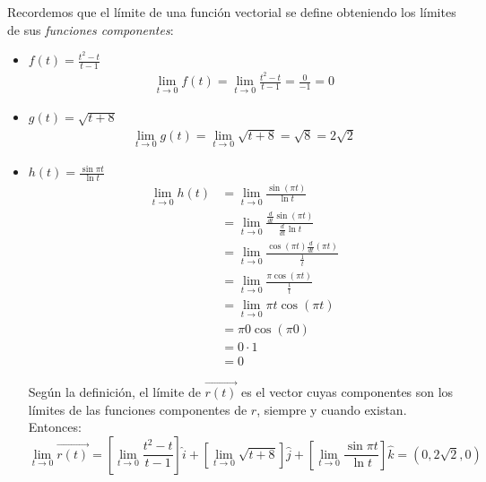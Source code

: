 \documentclass[12pt]{article}
\begin{document}
Recordemos que el límite de una función vectorial se define obteniendo los límites de sus \textit{funciones componentes}:
\begin{itemize}[format=\textbf]

\item $f(t)=\frac{t^2-t}{t-1}$
  \begin{align*}
    \lim_{t \to 0} f(t) = \lim_{t \to 0} \frac{t^2-t}{t-1}  =  \frac{0}{-1}= 0
  \end{align*}

\item $g(t)=\sqrt{t+8}$
  \begin{align*}
    \lim_{t \to 0} g(t) = \lim_{t \to 0} \sqrt{t+8} = \sqrt{8} = 2\sqrt{2}
  \end{align*}

\item $h(t)=\frac{\sin{\pi t}}{\ln{t}}$
  \begin{align*}
    \lim_{t \to 0} h(t)
    &= \lim_{t \to 0} \frac{\sin{(\pi t)}}{\ln{t}} \\
    &= \lim_{t \to 0} \frac{\frac{d}{dt} \sin{(\pi t)}}{ \frac{d}{dt} \ln{t}} \\
    &= \lim_{t \to 0} \frac{\cos{(\pi t)} \frac{d}{dt}(\pi t) }{ \frac{1}{t} } \\
    &= \lim_{t \to 0} \frac{\pi \cos{(\pi t)}}{ \frac{1}{t} } \\
    &= \lim_{t \to 0} \pi t \cos{(\pi t)} \\
    &= \pi 0 \cos{(\pi 0)} \\
    &= 0 \cdot 1 \\
    &= 0
  \end{align*}

  Según la definición, el límite de $\vec{r(t)}$ es el vector cuyas componentes son los límites de las funciones componentes de $r$, siempre y cuando existan. Entonces:
  \[
 \lim_{t \to 0} \vec{r(t)} = \left[ \lim_{t \to 0} \frac{t^2-t}{t-1} \right] \hat{i}+ \left[ \lim_{t \to 0} \sqrt{t+8} \right]\hat{j}+ \left[ \lim_{t \to 0} \frac{\sin{\pi t}}{\ln{t}} \right]\hat{k} = (0, 2\sqrt{2}, 0)
  \]
\end{itemize}

\end{document}
